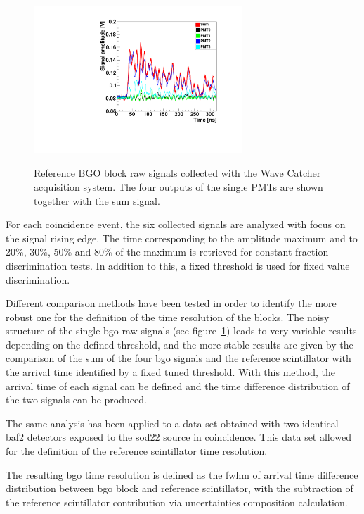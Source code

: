 \begin{figure} [!h]
\centering
{\includegraphics[width=0.7\textwidth]{03_GraphicFiles/chapter3_CLaRySproto/Absorber/images/raw_signalExample.pdf}}
\caption{Reference BGO block raw signals collected with the Wave Catcher acquisition system. The four outputs of the single PMTs are shown together with the sum signal.}
\label{chap3::fig::raw_signal}
\end{figure}


For each coincidence event, the six collected signals are analyzed with focus on the signal rising edge. The time corresponding to the amplitude maximum and to 20\%, 30\%, 50\% and 80\% of the maximum is retrieved for constant fraction discrimination tests. In addition to this, a fixed threshold is used for fixed value discrimination.

Different comparison methods have been tested in order to identify the more robust one for the definition of the time resolution of the blocks. The noisy structure of the single \gls{bgo} raw signals (see figure~\ref{chap3::fig::raw_signal})  leads to very variable results depending on the defined threshold, and the more stable results are given by the comparison of the sum of the four \gls{bgo} signals and the reference scintillator with the arrival time identified by a fixed tuned threshold. With this method, the arrival time of each signal can be defined and the time difference distribution of the two signals can be produced.

The same analysis has been applied to a data set obtained with two identical \gls{baf2} detectors exposed to the \gls{sod22} source in coincidence. This data set allowed for the definition of the reference scintillator time resolution.

The resulting \gls{bgo} time resolution is defined as the \gls{fwhm} of arrival time difference distribution between \gls{bgo} block and reference scintillator, with the subtraction of the reference scintillator contribution via uncertainties composition calculation.



